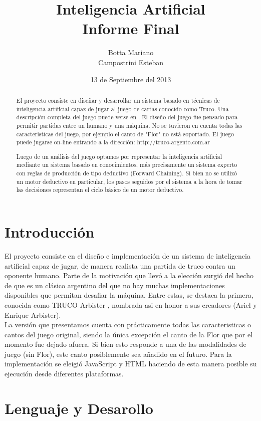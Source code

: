\documentclass[12pt,a4paper]{article}
\title{Inteligencia Artificial\\ 
\large Informe Final
}
\author{Botta Mariano \\ Campostrini Esteban}
\date{ \small 13 de Septiembre del 2013}
\begin{document}
\maketitle 

\begin{abstract}
El proyecto consiste en dise\~nar y desarrollar un sistema basado en t\'ecnicas de inteligencia artificial capaz de jugar al 
juego de cartas conocido como Truco.
Una descripci\'on completa del juego puede verse en \cite{reglas}. El dise\~no del juego fue pensado para permitir partidas 
entre un humano y una m\'aquina. No se tuvieron en cuenta todas las caracter\'isticas del juego, por ejemplo el canto de "Flor" 
no est\'a soportado. El juego puede jugarse on-line entrando a la direcci\'on: http://truco-argento.com.ar

Luego de un an\'alisis del juego optamos por representar la inteligencia artificial mediante un sistema basado en conocimientos, 
m\'as precisamente un sistema experto con reglas de producci\'on de tipo deductivo (Forward Chaining). Si bien no se utiliz\'o un motor
deductivo en particular, los pasos seguidos por el sistema a la hora de tomar las decisiones representan el ciclo b\'asico de un motor deductivo.
\end{abstract}
\pagebreak

\section{Introducci\'on}
El proyecto consiste en el dise\~no e implementaci\'on de un sistema de inteligencia artificial capaz de jugar, de manera realista
una partida de truco contra un oponente humano. Parte de la motivaci\'on que llev\'o a la elecci\'on surgi\'o del hecho de
que es un cl\'asico argentino del que no hay muchas implementaciones disponibles que permitan desafiar la m\'aquina. Entre
estas, se destaca la primera, conocida como TRUCO Arbister \cite{arbister}, nombrada asi en honor a sus creadores (Ariel y Enrique Arbister).\\
La versi\'on que presentamos cuenta con pr\'acticamente todas las caracteristicas o cantos del juego original, siendo la
\'unica excepci\'on el canto de la Flor que por el momento fue dejado afuera. Si bien esto responde a una de las modalidades de 
juego (sin Flor), este canto posiblemente sea a\~nadido en el futuro.
Para la implementaci\'on se eleigi\'o JavaScript y HTML haciendo de esta manera posible su ejecuci\'on desde diferentes plataformas. 


\section{Lenguaje y Desarollo}
\end{document}
